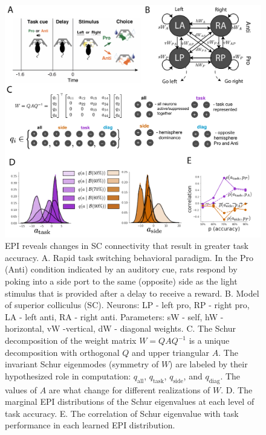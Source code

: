 \documentclass[11pt]{article}
\begin{document}
\begin{figure}
\begin{center}
\includegraphics[scale=0.5]{figures/fig4/fig4.pdf}
\end{center}
\caption{EPI reveals changes in SC \cite{duan2018collicular} connectivity that result in greater task accuracy.  A. Rapid task switching behavioral paradigm. In the Pro (Anti) condition indicated by an auditory cue,  rats respond by poking into a side port to the same (opposite) side as the light stimulus that is provided after a delay to receive a reward. B. Model of superior colliculus (SC). Neurons: LP - left pro, RP - right pro, LA - left anti, RA - right anti.  Parameters: sW - self, hW - horizontal, vW -vertical, dW - diagonal weights. C. The Schur decomposition of the weight matrix $W = QAQ^{-1}$ is a unique decomposition with orthogonal $Q$ and upper triangular $A$. The invariant Schur eigenmodes (symmetry of $W$) are labeled by their hypothesized role in computation: $q_{\text{all}}$, $q_{\text{task}}$, $q_{\text{side}}$, and $q_{\text{diag}}$.  The values of $A$ are what change for different realizations of $W$. D. The marginal EPI distributions of the Schur eigenvalues at each level of task accuracy. E. The correlation of Schur eigenvalue with task performance in each learned EPI distribution.}
\end{figure}
\end{document}
